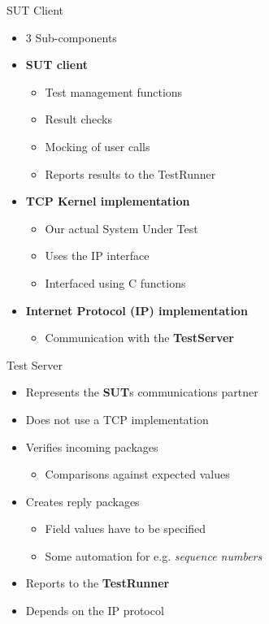 \documentclass[showdate=true, slidenumbers=slide]{beamerruhuisstijl169}
\begin{document}
\begin{frame}{SUT Client}
    \begin{itemize}
        \item 3 Sub-components
        \item \textbf{SUT client}
        \begin{itemize}
            \item Test management functions
            \item Result checks
            \item Mocking of user calls
            \item Reports results to the TestRunner
        \end{itemize}
        \item \textbf{TCP Kernel implementation}
        \begin{itemize}
            \item Our actual System Under Test
            \item Uses the IP interface
            \item Interfaced using C functions
        \end{itemize}
        \item \textbf{Internet Protocol (IP) implementation}
        \begin{itemize}
            \item Communication with the \textbf{TestServer}
        \end{itemize}
    \end{itemize}
\end{frame}

\begin{frame}{Test Server}
    \begin{itemize}
        \item Represents the \textbf{SUT}s communications partner
        \item Does not use a TCP implementation
        \item Verifies incoming packages
        \begin{itemize}
            \item Comparisons against expected values
        \end{itemize}
        \item Creates reply packages
        \begin{itemize}
            \item Field values have to be specified
            \item Some automation for e.g. \textit{sequence numbers}
        \end{itemize}
        \item Reports to the \textbf{TestRunner}
        \item Depends on the IP protocol
    \end{itemize}
\end{frame}
\end{document}
